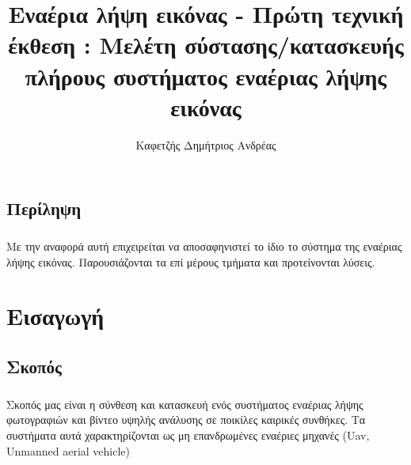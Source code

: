 \documentclass[a4paper, 12pt, twoside]{report}
\author{Καφετζής Δημήτριος Ανδρέας}
\title{Εναέρια λήψη εικόνας - Πρώτη τεχνική έκθεση : Μελέτη σύστασης/κατασκευής πλήρους συστήματος εναέριας λήψης εικόνας}
\begin{document}
	
	\maketitle
	
	\section*{Περίληψη}
		\paragraph{}{Με την αναφορά αυτή επιχειρείται να αποσαφηνιστεί το ίδιο το σύστημα της εναέριας λήψης εικόνας. Παρουσιάζονται τα επί μέρους τμήματα και προτείνονται λύσεις.
		}
		
	\tableofcontents

	\newpage
	\listoffigures

	\newpage
	\listoftables
	
	\makeatletter
		\def\cleardoublepage{
			\clearpage\if@twoside \ifodd\c@page\else
	    	\hbox{}
	    	\thispagestyle{plain}
	    	\newpage
    		\if@twocolumn\hbox{}\newpage\fi\fi\fi
    	}
	\makeatother \clearpage{\pagestyle{plain}\cleardoublepage}

	\pagestyle{fancy}
	\fancyhf{}
	\renewcommand{\chaptermark}[1]{\markboth{ \emph{#1}}{}}

	\fancyhead[RE]{\leftmark}
	\fancyfoot[LE,RO]{\thepage}
	
	\chapter{Εισαγωγή}
		
		\section{Σκοπός}
			\paragraph{}{Σκοπός μας είναι η σύνθεση και κατασκευή ενός συστήματος εναέριας λήψης φωτογραφιών και βίντεο υψηλής ανάλυσης σε ποικίλες καιρικές συνθήκες. Τα συστήματα αυτά χαρακτηρίζονται ως μη επανδρωμένες εναέριες μηχανές (Uav, Unmanned aerial vehicle)
			}
			
\end{document}
